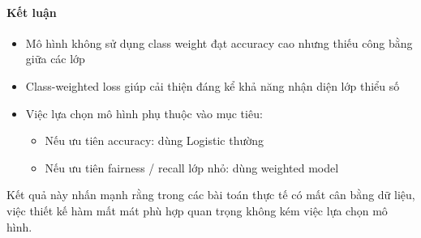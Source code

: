 \paragraph{Kết luận}

\begin{itemize}
    \item Mô hình không sử dụng class weight đạt accuracy cao nhưng thiếu công bằng giữa các lớp
    \item Class-weighted loss giúp cải thiện đáng kể khả năng nhận diện lớp thiểu số
    \item Việc lựa chọn mô hình phụ thuộc vào mục tiêu:
    \begin{itemize}
        \item Nếu ưu tiên accuracy: dùng Logistic thường
        \item Nếu ưu tiên fairness / recall lớp nhỏ: dùng weighted model
    \end{itemize}
\end{itemize}

Kết quả này nhấn mạnh rằng trong các bài toán thực tế có mất cân bằng dữ liệu, việc thiết kế hàm mất mát phù hợp quan trọng không kém việc lựa chọn mô hình.
